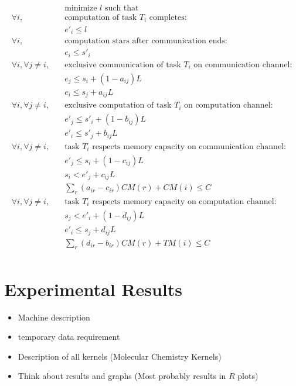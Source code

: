 \documentclass[runningheads]{llncs} %
\begin{document}
\vspace*{-0.5cm}
\begin{align*}
& \text{minimize } l \text{ such that }\\
\forall i, \quad & \text{computation of task } T_i \text{ completes:}\\
& e'_i \leq l\\
\forall i, \quad & \text{computation stars after communication ends:}\\
& e_i \leq s'_i\\
\forall i, \forall j\ne i, \quad & \text{exclusive communication of task }T_i \text{ on communication channel:}\\
& e_j \leq s_i +(1-a_{ij})L\\
& e_i\leq s_j +a_{ij}L\\
\forall i, \forall j\ne i, \quad & \text{exclusive computation of task }T_i \text{ on computation channel:}\\
& e'_j \leq s'_i +(1-b_{ij})L\\
& e'_i\leq s'_j +b_{ij}L\\
\forall i, \forall j\ne i, \quad & \text{task }T_i \text{ respects memory capacity on communication channel:}\\
& e'_j \leq s_i +(1-c_{ij})L\\
& s_i< e'_j +c_{ij}L\\
& \sum_r (a_{ir} - c_{ir})CM(r) + CM(i) \le C\\
\forall i, \forall j\ne i, \quad & \text{task }T_i \text{ respects memory capacity on computation channel:}\\
& s_j < e'_i +(1-d_{ij})L\\
& e'_i\leq s_j +d_{ij}L\\
& \sum_r (d_{ir} - b_{ir})CM(r) + TM(i) \le C\\
\end{align*} 

	\section{Experimental Results}
	\label{sec:exp}
	
	
	\begin{itemize}
		\item Machine description
		\item temporary data requirement
		\item Description of all kernels (Molecular Chemistry Kernels)
		\item Think about results and graphs (Most probably results in $R$ plots)
	\end{itemize}
\end{document}
